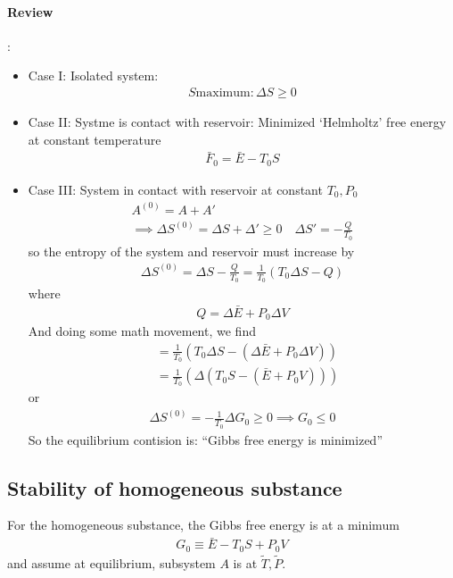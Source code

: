 \documentclass[../main.tex]{subfiles}
\begin{document}
\paragraph{Review}:
\begin{itemize}
    \item Case I: Isolated system:
    \begin{align*}
        S \textrm{maximum}: \Delta S \geq 0
    \end{align*}
    \item Case II: Systme is contact with reservoir: Minimized `Helmholtz' free energy at constant temperature
    \begin{align*}
        \bar F_0 = \bar E - T_0 S
    \end{align*}
    \item Case III: System in contact with reservoir at constant $T_0, P_0$
    \begin{align*}
        A^{(0)} = A + A' \\
        \implies \Delta S^{(0)} = \Delta S + \Delta ' \geq 0 \quad \Delta S' = -\frac{Q}{T_0}
    \end{align*}
    so the entropy of the system and reservoir must increase by
    \begin{align*}
        \Delta S^{(0)} = \Delta S - \frac{Q}{T_0} = \frac{1}{T_0} (T_0 \Delta S - Q)
    \end{align*}
    where
    \begin{align*}
        Q = \Delta \bar E + P_0 \Delta V
    \end{align*}
    And doing some math movement, we find 
    \begin{align*}
        &= \frac{1}{T_0} (T_0 \Delta S - (\Delta \bar E + P_0 \Delta V)) \\
        &= \frac{1}{T_0} (\Delta (T_0 S - (\bar E + P_0 V)))
    \end{align*}
    or
    \begin{align*}
        \Delta S^{(0)} = -\frac{1}{T_0} \Delta G_0 \geq 0 \implies G_0 \leq 0
    \end{align*}
    So the equilibrium contision is: ``Gibbs free energy is minimized''
\end{itemize}

\subsection{Stability of homogeneous substance}
For the homogeneous substance, the Gibbs free energy is at a minimum
\begin{align*}
    G_0 \equiv \bar E - T_0 S + P_0 V
\end{align*}
and assume at equilibrium, subsystem $A$ is at $\tilde T, \tilde P$.
\end{document}
